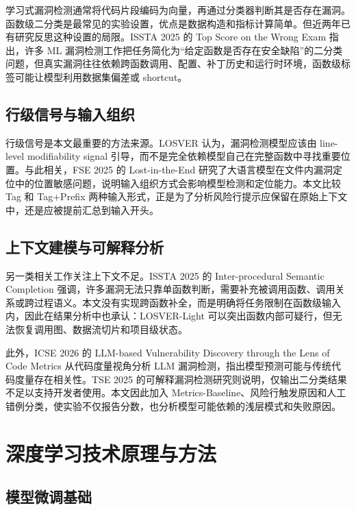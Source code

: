 \documentclass[10pt]{article}
\newcommand{\methodname}{LOSVER-Light}
\begin{document}
学习式漏洞检测通常将代码片段编码为向量，再通过分类器判断其是否存在漏洞。函数级二分类是最常见的实验设置，优点是数据构造和指标计算简单。但近两年已有研究反思这种设置的局限。ISSTA 2025 的 Top Score on the Wrong Exam 指出，许多 ML 漏洞检测工作把任务简化为“给定函数是否存在安全缺陷”的二分类问题，但真实漏洞往往依赖跨函数调用、配置、补丁历史和运行时环境，函数级标签可能让模型利用数据集偏差或 shortcut\cite{risse2025topscore}。

\subsection{行级信号与输入组织}

行级信号是本文最重要的方法来源。LOSVER 认为，漏洞检测模型应该由 line-level modifiability signal 引导，而不是完全依赖模型自己在完整函数中寻找重要位置\cite{nam2025losver}。与此相关，FSE 2025 的 Lost-in-the-End 研究了大语言模型在文件内漏洞定位中的位置敏感问题，说明输入组织方式会影响模型检测和定位能力\cite{sovrano2025lostend}。本文比较 Tag 和 Tag+Prefix 两种输入形式，正是为了分析风险行提示应保留在原始上下文中，还是应被提前汇总到输入开头。

\subsection{上下文建模与可解释分析}

另一类相关工作关注上下文不足。ISSTA 2025 的 Inter-procedural Semantic Completion 强调，许多漏洞无法只靠单函数判断，需要补充被调用函数、调用关系或跨过程语义\cite{wu2025vulnsc}。本文没有实现跨函数补全，而是明确将任务限制在函数级输入内，因此在结果分析中也承认：\methodname{} 可以突出函数内部可疑行，但无法恢复调用图、数据流切片和项目级状态。

此外，ICSE 2026 的 LLM-based Vulnerability Discovery through the Lens of Code Metrics 从代码度量视角分析 LLM 漏洞检测，指出模型预测可能与传统代码度量存在相关性\cite{weissberg2026metrics}。TSE 2025 的可解释漏洞检测研究则说明，仅输出二分类结果不足以支持开发者使用\cite{mao2025explainable}。本文因此加入 Metrics-Baseline、风险行触发原因和人工错例分类，使实验不仅报告分数，也分析模型可能依赖的浅层模式和失败原因。

\section{深度学习技术原理与方法}

\subsection{模型微调基础}
\end{document}
